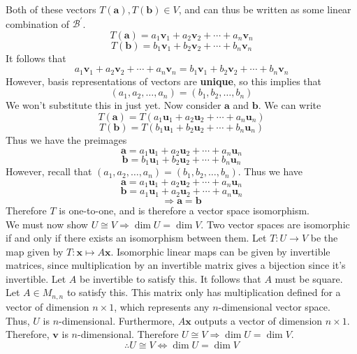 \documentclass[12pt, letterpaper]{article}
\begin{document}
\begin{solution}
\[    \]
    Both of these vectors \(T(\mathbf{a}),T(\mathbf{b})\in V\), and can thus be written as some linear combination of \(\mathcal{B} ^{\prime} \).
    \[
        T(\mathbf{a})=a_1 \mathbf{v}_1 + a_2 \mathbf{v}_2 + \cdots + a_n \mathbf{v}_n
    \]
    \[
        T(\mathbf{b})=b_1 \mathbf{v}_1 + b_2 \mathbf{v}_2 + \cdots + b_n \mathbf{v}_n
    \]
    It follows that
    \[
        a_1 \mathbf{v}_1 + a_2 \mathbf{v}_2 + \cdots + a_n \mathbf{v}_n = b_1 \mathbf{v}_1 + b_2 \mathbf{v}_2 + \cdots + b_n \mathbf{v}_n
    \]
    However, basis representations of vectors are \textbf{unique}, so this implies that 
    \[
        (a_1,a_2,\ldots,a_n)=(b_1,b_2,\ldots,b_n)
    \]
    We won't substitute this in just yet. Now consider \(\mathbf{a}\) and \(\mathbf{b}\). We can write 
    \[
        T(\mathbf{a})=T(a_1 \mathbf{u}_1 + a_2 \mathbf{u}_2 + \cdots + a_n \mathbf{u}_n)
    \]
    \[
        T(\mathbf{b})=T(b_1 \mathbf{u}_1 + b_2 \mathbf{u}_2 + \cdots + b_n \mathbf{u}_n)
    \]
    Thus we have the preimages
    \[
     \mathbf{a}=   a_1 \mathbf{u}_1 + a_2 \mathbf{u}_2 + \cdots + a_n \mathbf{u}_n
        \]
        \[
      \mathbf{b}=  b_1 \mathbf{u}_1 + b_2 \mathbf{u}_2 + \cdots + b_n \mathbf{u}_n
    \]
    However, recall that \((a_1,a_2,\ldots,a_n)=(b_1,b_2,\ldots,b_n)\). Thus we have
    \[
        \mathbf{a}=   a_1 \mathbf{u}_1 + a_2 \mathbf{u}_2 + \cdots + a_n \mathbf{u}_n
    \]
    \[
        \mathbf{b}=a_1 \mathbf{u}_1 + a_2 \mathbf{u}_2 + \cdots + a_n \mathbf{u}_n
    \]
    \[
        \Longrightarrow \mathbf{a}=\mathbf{b}
    \]
    Therefore \(T\) is one-to-one, and is therefore a vector space isomorphism.\\
    We must now show \(U\cong V \Longrightarrow \dim U = \dim V\). Two vector spaces are isomorphic if and only if there exists an isomorphism between them. Let \(T:U\to V\) be the map given by \(T:\mathbf{x}\mapsto A \mathbf{x}\). Isomorphic linear maps can be given by invertible matrices, since multiplication by an invertible matrix gives a bijection since it's invertible. Let \(A\) be invertible to satisfy this. It follows that \(A\) must be square. Let \(A\in M_{n,n}\) to satisfy this. This matrix only has multiplication defined for a vector of dimension \(n\times 1\), which represents any \(n\)-dimensional vector space. Thus, \(U\) is \(n\)-dimensional. Furthermore, \(A \mathbf{x}\) outputs a vector of dimension \(n\times 1\). Therefore, \(\mathbf{v}\) is \(n\)-dimensional. Therefore \(U\cong V \Longrightarrow \dim U =\dim V\).\\
    \[
        \therefore U\cong V \iff \dim U =\dim V
    \]
\end{solution}
\end{document}
